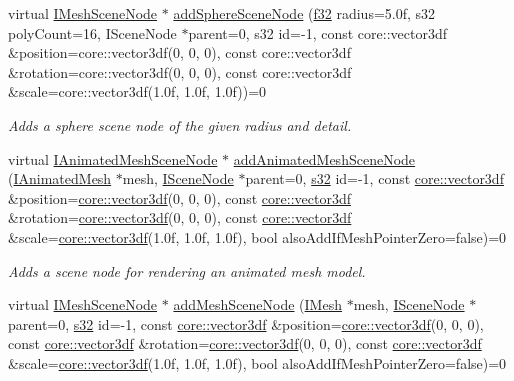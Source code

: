 \begin{DoxyCompactItemize}
virtual \hyperlink{classirr_1_1scene_1_1IMeshSceneNode}{I\+Mesh\+Scene\+Node} $\ast$ \hyperlink{classirr_1_1scene_1_1ISceneManager_acd6454347276ff8c74e46063970cfc04}{add\+Sphere\+Scene\+Node} (\hyperlink{namespaceirr_a0277be98d67dc26ff93b1a6a1d086b07}{f32} radius=5.\+0f, s32 poly\+Count=16, I\+Scene\+Node $\ast$parent=0, s32 id=-\/1, const core\+::vector3df \&position=core\+::vector3df(0, 0, 0), const core\+::vector3df \&rotation=core\+::vector3df(0, 0, 0), const core\+::vector3df \&scale=core\+::vector3df(1.\+0f, 1.\+0f, 1.\+0f))=0
\begin{DoxyCompactList}\small\item\em Adds a sphere scene node of the given radius and detail. \end{DoxyCompactList}\item 
virtual \hyperlink{classirr_1_1scene_1_1IAnimatedMeshSceneNode}{I\+Animated\+Mesh\+Scene\+Node} $\ast$ \hyperlink{classirr_1_1scene_1_1ISceneManager_a8e2e0cd3a27e85b4116855dd2f3365b8}{add\+Animated\+Mesh\+Scene\+Node} (\hyperlink{classirr_1_1scene_1_1IAnimatedMesh}{I\+Animated\+Mesh} $\ast$mesh, \hyperlink{classirr_1_1scene_1_1ISceneNode}{I\+Scene\+Node} $\ast$parent=0, \hyperlink{namespaceirr_ac66849b7a6ed16e30ebede579f9b47c6}{s32} id=-\/1, const \hyperlink{namespaceirr_1_1core_a06f169d08b5c429f5575acb7edbad811}{core\+::vector3df} \&position=\hyperlink{namespaceirr_1_1core_a06f169d08b5c429f5575acb7edbad811}{core\+::vector3df}(0, 0, 0), const \hyperlink{namespaceirr_1_1core_a06f169d08b5c429f5575acb7edbad811}{core\+::vector3df} \&rotation=\hyperlink{namespaceirr_1_1core_a06f169d08b5c429f5575acb7edbad811}{core\+::vector3df}(0, 0, 0), const \hyperlink{namespaceirr_1_1core_a06f169d08b5c429f5575acb7edbad811}{core\+::vector3df} \&scale=\hyperlink{namespaceirr_1_1core_a06f169d08b5c429f5575acb7edbad811}{core\+::vector3df}(1.\+0f, 1.\+0f, 1.\+0f), bool also\+Add\+If\+Mesh\+Pointer\+Zero=false)=0
\begin{DoxyCompactList}\small\item\em Adds a scene node for rendering an animated mesh model. \end{DoxyCompactList}\item 
virtual \hyperlink{classirr_1_1scene_1_1IMeshSceneNode}{I\+Mesh\+Scene\+Node} $\ast$ \hyperlink{classirr_1_1scene_1_1ISceneManager_aa0a32f9f5b13d94e24eed80bdb999919}{add\+Mesh\+Scene\+Node} (\hyperlink{classirr_1_1scene_1_1IMesh}{I\+Mesh} $\ast$mesh, \hyperlink{classirr_1_1scene_1_1ISceneNode}{I\+Scene\+Node} $\ast$parent=0, \hyperlink{namespaceirr_ac66849b7a6ed16e30ebede579f9b47c6}{s32} id=-\/1, const \hyperlink{namespaceirr_1_1core_a06f169d08b5c429f5575acb7edbad811}{core\+::vector3df} \&position=\hyperlink{namespaceirr_1_1core_a06f169d08b5c429f5575acb7edbad811}{core\+::vector3df}(0, 0, 0), const \hyperlink{namespaceirr_1_1core_a06f169d08b5c429f5575acb7edbad811}{core\+::vector3df} \&rotation=\hyperlink{namespaceirr_1_1core_a06f169d08b5c429f5575acb7edbad811}{core\+::vector3df}(0, 0, 0), const \hyperlink{namespaceirr_1_1core_a06f169d08b5c429f5575acb7edbad811}{core\+::vector3df} \&scale=\hyperlink{namespaceirr_1_1core_a06f169d08b5c429f5575acb7edbad811}{core\+::vector3df}(1.\+0f, 1.\+0f, 1.\+0f), bool also\+Add\+If\+Mesh\+Pointer\+Zero=false)=0

\end{DoxyCompactItemize}
